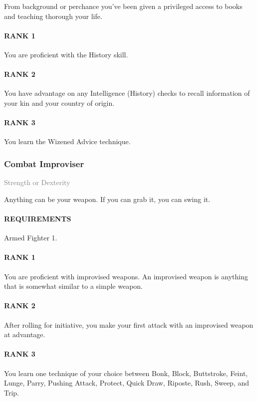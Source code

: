 \normalsize
From background or perchance you've been given a privileged access to books and teaching thorough your life.
\paragraph{RANK 1} You are proficient with the History skill.
\paragraph{RANK 2} You have advantage on any Intelligence (History) checks to recall information of your kin and your country of origin.
\paragraph{RANK 3} You learn the Wizened Advice technique.

\subsubsection{Combat Improviser} \label{feat::combatimproviser}
\small{\textcolor{gray}{Strength or Dexterity}}

\normalsize
Anything can be your weapon.
If you can grab it, you can swing it.
\paragraph{REQUIREMENTS} Armed Fighter 1.
\paragraph{RANK 1} You are proficient with improvised weapons.
An improvised weapon is anything that is somewhat similar to a simple weapon.
\paragraph{RANK 2} After rolling for initiative, you make your first attack with an improvised weapon at advantage.
\paragraph{RANK 3} You learn one technique of your choice between Bonk, Block, Buttstroke, Feint, Lunge, Parry, Pushing Attack, Protect, Quick Draw, Riposte, Rush, Sweep, and Trip.

